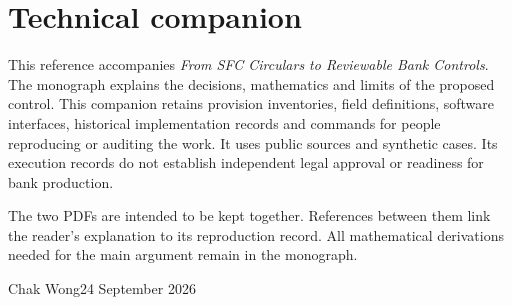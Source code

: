 \documentclass[12pt,a4paper,oneside,openany]{book}
\renewcommand{\chaptermark}[1]{\markboth{Chapter \thechapter}{}}
\begin{document}
\raggedbottom
\frontmatter
\chapter*{Technical companion}

This reference accompanies \emph{From SFC Circulars to Reviewable Bank Controls}.
The monograph explains the decisions, mathematics and limits of the proposed
control. This companion retains provision inventories, field definitions,
software interfaces, historical implementation records and commands for people
reproducing or auditing the work. It uses public sources and synthetic cases.
Its execution records do not establish independent legal approval or readiness
for bank production.

The two PDFs are intended to be kept together. References between them link the
reader's explanation to its reproduction record. All mathematical derivations
needed for the main argument remain in the monograph.

Chak Wong\hfill 24 September 2026

\tableofcontents
\mainmatter
\appendix
{}
\renewcommand{\chaptermark}[1]{\markboth{Appendix \thechapter}{}}





\backmatter
\begingroup
\raggedright


\endgroup
\end{document}
